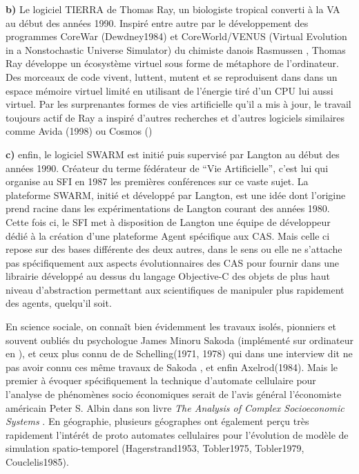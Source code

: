 \textbf{b)} Le logiciel TIERRA de Thomas Ray, un biologiste tropical converti à la VA au début des années 1990. Inspiré entre autre par le développement des programmes CoreWar (Dewdney1984) et CoreWorld/VENUS (Virtual Evolution in a Nonstochastic Universe Simulator) du chimiste danois Rasmussen \autocite{Rasmussen1990}, Thomas Ray développe un écosystème virtuel sous forme de métaphore de l'ordinateur. Des morceaux de code vivent, luttent, mutent et se reproduisent dans dans un espace mémoire virtuel limité en utilisant de l'énergie tiré d'un CPU lui aussi virtuel. Par les surprenantes formes de vies artificielle qu'il a mis à jour, le travail toujours actif de Ray a inspiré d'autres recherches et d'autres logiciels similaires comme Avida (1998) ou Cosmos (\autocite{Taylor1999})

\textbf{c)} enfin, le logiciel SWARM \autocite{Minar1996} est initié puis supervisé par Langton au début des années 1990. Créateur du terme fédérateur de \enquote{Vie Artificielle}, c'est lui qui organise au SFI en 1987 les premières conférences sur ce vaste sujet. La plateforme SWARM, initié et développé par Langton, est une idée dont l'origine prend racine dans les expérimentations de Langton courant des années 1980. Cette fois ci, le SFI met à disposition de Langton une équipe de développeur dédié à la création d'une plateforme Agent spécifique aux CAS. Mais celle ci repose sur des bases différente des deux autres, dans le sens ou elle ne s'attache pas spécifiquement aux aspects évolutionnaires des CAS pour fournir dans une librairie développé au dessus du langage Objective-C des objets de plus haut niveau d'abstraction permettant aux scientifiques de manipuler plus rapidement des agents, quelqu'il soit.

En science sociale, on connaît bien évidemment les travaux isolés, pionniers et souvent oubliés \autocites{Hegselmann2012, Aydinonat2007} du psychologue James Minoru Sakoda \autocite{Sakoda1949} (implémenté sur ordinateur en \autocite{Sakoda1971}), et ceux plus connu de de Schelling(1971, 1978) qui dans une interview dit ne pas avoir connu ces même travaux de Sakoda \autocite{Aydinonat2005}, et enfin Axelrod(1984). Mais le premier à évoquer spécifiquement la technique d'automate cellulaire pour l'analyse de phénomènes socio économiques serait de l'avis général l'économiste américain Peter S. Albin dans son livre \textit{The Analysis of Complex Socioeconomic Systems} \textcites{Smith1975, Ganguly2003, Benenson2004, Portugali2000}. En géographie, plusieurs géographes ont également perçu très rapidement l'intérét de proto automates cellulaires pour l'évolution de modèle de simulation spatio-temporel (Hagerstrand1953, Tobler1975, Tobler1979, Couclelis1985).

